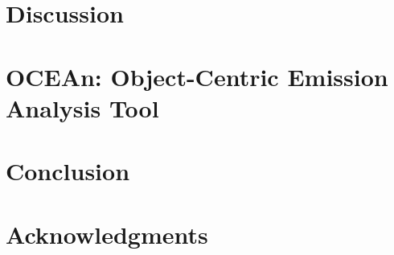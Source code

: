 \documentclass[a4paper,11pt,twoside]{pads-thesis}
\begin{document}
\chapter{Discussion} \label{chap:discussion}


\chapter{OCEAn: Object-Centric Emission Analysis Tool} \label{chap:impl}


\chapter{Conclusion} \label{chap:conclusion}




\chapter*{Acknowledgments}

\end{document}
